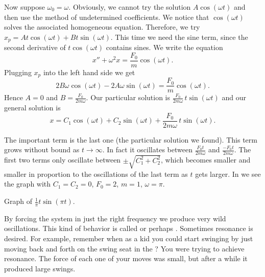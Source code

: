 Now suppose $\omega_0 = \omega$.  Obviously, we cannot try
the solution $A \cos (\omega t)$ and then use the method of undetermined
coefficients.  We notice that $\cos (\omega t)$ solves the associated
homogeneous equation.  Therefore,
we 
try $x_p = A t \cos (\omega t) + B t \sin (\omega t)$.  This time we need
the sine
term, since the second derivative of $t \cos (\omega t)$ contains sines.
We write the equation
\begin{equation*}
x'' + \omega^2 x = \frac{F_0}{m} \cos ( \omega t) .
\end{equation*}
Plugging $x_p$ into the left hand side we get
\begin{equation*}
2 B \omega \cos (\omega t) - 2 A \omega \sin (\omega t) = 
\frac{F_0}{m} \cos (\omega t) .
\end{equation*}
Hence $A = 0$ and $B = \frac{F_0}{2m\omega}$.  Our particular solution is
$\frac{F_0}{2m\omega} \, t \sin (\omega t)$ and our general solution is
\begin{equation*}
x = C_1 \cos (\omega t) + C_2 \sin (\omega t)
+ \frac{F_0}{2m\omega} \, t \sin (\omega t) .
\end{equation*}

The important term is the last one (the particular solution we found).  
This term grows without bound as $t \to \infty$.  In fact it
oscillates 
between $\frac{F_0 t}{2m\omega}$ and
$\frac{- F_0 t}{2m\omega}$.  The first two terms only oscillate between
$\pm\sqrt{C_1^2 + C_2^2}$, which becomes smaller and smaller in proportion to
the oscillations of the last term as $t$ gets larger.  In
 we see the graph with $C_1=C_2=0$, $F_0 = 2$,
$m=1$, $\omega = \pi$.

\begin{mywrapfig}{3.25in}
\capstart
{}
\caption{Graph of
$\frac{1}{\pi} t \sin (\pi t)$.\label{3.6:resonancefig}}
\end{mywrapfig}

By forcing the system in just the right frequency we produce very wild
oscillations.  This kind of behavior is called \emph{} or
perhaps
\emph{}.  Sometimes resonance is
desired.  For
example, remember when as a kid you could start swinging by just moving back
and forth on the swing seat in the ?  You were trying to
achieve resonance.  The force of each one of your moves was small, but after a
while it produced large swings.

